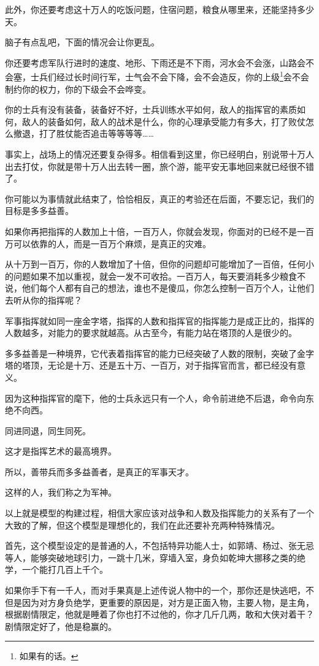 \begin{multicols}{\theparacolNo}
此外，你还要考虑这十万人的吃饭问题，住宿问题，粮食从哪里来，还能坚持多少天。

脑子有点乱吧，下面的情况会让你更乱。

你还要考虑军队行进时的速度、地形、下雨还是不下雨，河水会不会涨，山路会不会塞，士兵们经过长时间行军，士气会不会下降，会不会造反，你的上级\footnote{如果有的话。}会不会制约你的权力，你的下级会不会哗变。

你的士兵有没有装备，装备好不好，士兵训练水平如何，敌人的指挥官的素质如何，敌人的装备如何，敌人的战术是什么，你的心理承受能力有多大，打了败仗怎么撤退，打了胜仗能否追击等等等等……

事实上，战场上的情况还要复杂得多。相信看到这里，你已经明白，别说带十万人出去打仗，你就是带十万人出去转一圈，旅个游，能平安无事地回来就已经很不错了。

你可能以为事情就此结束了，恰恰相反，真正的考验还在后面，不要忘记，我们的目标是多多益善。

如果你再把指挥的人数加上十倍，一百万人，你就会发现，你面对的已经不是一百万可以依靠的人，而是一百万个麻烦，是真正的灾难。

从十万到一百万，你的人数增加了十倍，但你的问题却可能增加了一百倍，任何小的问题如果不加以重视，就会一发不可收拾。一百万人，每天要消耗多少粮食不说，他们每个人都有自己的想法，谁也不是傻瓜，你怎么控制一百万个人，让他们去听从你的指挥呢？

军事指挥就如同一座金字塔，指挥的人数和指挥官的指挥能力是成正比的，指挥的人数越多，对能力的要求就越高。从古至今，有能力站在塔顶的人是很少的。

多多益善是一种境界，它代表着指挥官的能力已经突破了人数的限制，突破了金字塔的塔顶，无论是十万、还是五十万、一百万，对于指挥官而言，都已经没有意义。

因为这种指挥官的麾下，他的士兵永远只有一个人，命令前进绝不后退，命令向东绝不向西。

同进同退，同生同死。

这才是指挥艺术的最高境界。

所以，善带兵而多多益善者，是真正的军事天才。

这样的人，我们称之为军神。

以上就是模型的构建过程，相信大家应该对战争和人数及指挥能力的关系有了一个大致的了解，但这个模型是理想化的，我们在此还要补充两种特殊情况。

首先，这个模型设定的是普通的人，不包括特异功能人士，如郭靖、杨过、张无忌等人，能够突破地球引力，一跳十几米，穿墙入室，身负如乾坤大挪移之类的绝学，一个能打几百上千个。

如果你手下有一千人，而对手果真是上述传说人物中的一个，那你还是快逃吧，不但是因为对方身负绝学，更重要的原因是，对方是正面入物，主要人物，是主角，根据剧情限定，他就是睡着了你也打不过他的，你才几斤几两，敢和大侠对着干？剧情限定好了，他是稳赢的。


\end{multicols}

